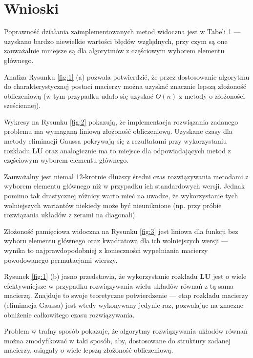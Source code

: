 \documentclass{classrep}
\newcommand{\mL}{\bm{L}}
\newcommand{\mU}{\bm{U}}
\begin{document}
\section{Wnioski}
	Poprawność działania zaimplementowanych metod widoczna jest w Tabeli 1 --- uzyskano bardzo niewielkie wartości błędów względnych, przy czym są one zauważalnie mniejsze są dla algorytmów z częściowym wyborem elementu głównego.
	
	Analiza Rysunku \ref{fig:1} (a) pozwala potwierdzić, że przez dostosowanie algorytmu do charakterystycznej postaci macierzy można uzyskać znacznie lepszą złożoność obliczeniową (w tym przypadku udało się uzyskać $O(n)$ z metody o złożoności sześciennej).
	
	Wykresy na Rysunku \ref{fig:2} pokazują, że implementacja rozwiązania zadanego problemu ma wymaganą liniową złożoność obliczeniową. 
	Uzyskane czasy dla metody eliminacji Gaussa pokrywają się z rezultatami przy wykorzystaniu rozkładu $\mL\mU$ oraz analogicznie ma to miejsce dla odpowiadających metod z częściowym wyborem elementu głównego.
	
	Zauważalny jest niemal 12-krotnie dłuższy średni czas rozwiązywania metodami z wyborem elementu głównego niż w przypadku ich standardowych wersji. Jednak pomimo tak drastycznej różnicy warto mieć na uwadze, że wykorzystanie tych wolniejszych wariantów niekiedy może być nieuniknione (np. przy próbie rozwiązania układów z zerami na diagonali).
	
	Złożoność pamięciowa widoczna na Rysunku \ref{fig:3} jest liniowa dla funkcji bez wyboru elementu głównego oraz kwadratowa dla ich wolniejszych wersji --- wynika to najprawdopodobniej z konieczności wypełniania macierzy powodowanego permutacjami wierszy.
	
	Rysunek \ref{fig:1} (b) jasno przedstawia, że wykorzystanie rozkładu $\mL\mU$ jest o wiele efektywniejsze w przypadku rozwiązywania wielu układów równań z tą sama macierzą. Znajduje to swoje teoretyczne potwierdzenie --- etap rozkładu macierzy (eliminacja Gaussa) jest wtedy wykonywany jedynie raz, pozwalając na znaczne obniżenie całkowitego czasu rozwiązywania. 
	
	Problem w trafny sposób pokazuje, że algorytmy rozwiązywania układów równań można zmodyfikować w taki sposób, aby, dostosowane do struktury zadanej macierzy, osiągały o wiele lepszą złożoność obliczeniową.
	
	
\end{document}

